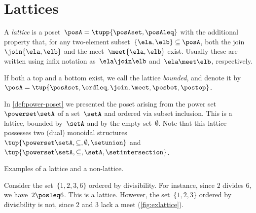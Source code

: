 
\section{Lattices}


\begin{definition}[Lattice]
	\label{def:lattice}
	A \emph{lattice} is a poset~$\posA=\tupp{\posAset,\posAleq}$ with the additional property that, for any two-element subset~$\{\ela, \elb \} \subseteq \posA$, both the join~$\join \{\ela, \elb \}$ and the meet~$\meet \{\ela, \elb \}$ exist.
	Usually these are written using infix notation as~$\ela \join \elb$ and~$\ela \meet \elb$, respectively.
\end{definition}


\begin{remark}
	\label{rem:bounded-lattices}
	If both a top and a bottom exist, we call the lattice \emph{bounded}, and denote it by~$\posA = \tup{\posAset,\ordleq,\join,\meet,\posbot,\postop}$.
\end{remark}

\begin{example}
	In \cref{def:power-poset} we presented the poset arising from the power set~$\powerset \setA$ of a set~$\setA$ and ordered via subset inclusion.
	This is a lattice, bounded by~$\setA$ and by the empty set~$\emptyset$.
	Note that this lattice possesses two (dual) monoidal structures~$\tup{\powerset \setA,\subseteq,\emptyset,\setunion}$ and~$\tup{\powerset \setA,\subseteq,\setA,\setintersection}$.
\end{example}

\begin{marginfigure}
	\centering

	\caption{Examples of a lattice and a non-lattice. }
	\label{fig:exlattice}
\end{marginfigure}

\begin{example}
	Consider the set~$\{1,2,3,6\}$ ordered by divisibility.
	For instance, since 2 divides 6, we have~$2\posleq 6$.
	This is a lattice.
	However, the set~$\{1,2,3\}$ ordered by divisibility is not, since 2 and 3 lack a meet (\cref{fig:exlattice}).
\end{example}

